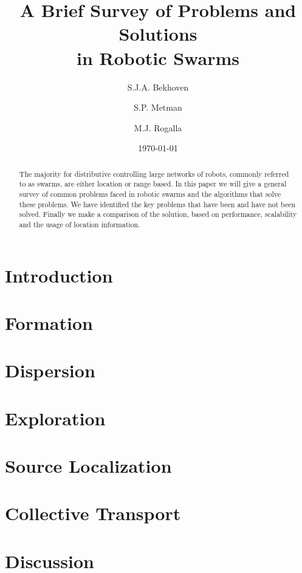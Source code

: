 \documentclass[a4paper]{article}
\title{A Brief Survey of Problems and Solutions \\ in Robotic Swarms}
\author{S.J.A. Bekhoven  \and
    S.P. Metman \and
    M.J. Rogalla}
\date{\today}
\begin{document}
\maketitle
\thispagestyle{empty}

\begin{abstract}
The majority for distributive controlling large networks of robots, commonly referred to as swarms, are either location or range based.
In this paper we will give a general survey of common problems faced in robotic swarms and the algorithms that solve these problems.
We have identified the key problems that have been and have not been solved. Finally we make a comparison of the solution, based on performance, scalability and the usage of location information.
\end{abstract}


\section{Introduction}
  

\section{Formation}
  \label{sec:Formation}
  

\section{Dispersion}
  \label{sec:Dispersion}
  

\section{Exploration}
  \label{sec:Exploration}
  
 
\section{Source Localization}
  \label{sec:Localization}
  

\section{Collective Transport}
  \label{sec:CollectiveTransport}
  
  
\section{Discussion}
  \label{sec:Discussion}
  

\clearpage



\end{document}
